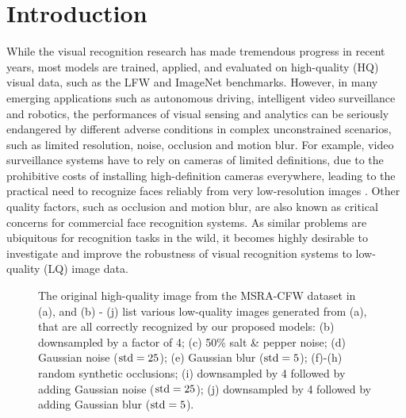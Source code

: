 \documentclass[10pt,twocolumn,twoside]{IEEEtran} %
\begin{document}
\section{Introduction}\label{sec:intro}%

While the visual recognition research has made tremendous progress in recent years, most models are trained, applied, and evaluated on high-quality (HQ) visual data, such as the LFW \cite{LFW} and ImageNet \cite{Alex} benchmarks. 
However, in many emerging applications such as autonomous driving, intelligent video surveillance and robotics, the performances of visual sensing and analytics can be seriously endangered by different adverse conditions \cite{de2014face} in complex unconstrained scenarios, such as limited resolution, noise, occlusion and motion blur. 
For example, video surveillance systems have to rely on cameras of limited definitions, due to the prohibitive costs of installing high-definition cameras everywhere, leading to the practical need to recognize faces reliably from very low-resolution images \cite{VFR}. 
Other quality factors, such as occlusion and motion blur, are also known as critical concerns for commercial face recognition systems. 
As similar problems are ubiquitous for recognition tasks in the wild, it becomes highly desirable to investigate and improve the robustness of visual recognition systems to low-quality (LQ) image data.

\begin{figure}[t]
	\centering
	\begin{minipage}{0.47\textwidth}
		\end{minipage}
	\caption{The original high-quality image from the MSRA-CFW dataset in (a), and (b) - (j) list various low-quality images generated from (a), that are all correctly recognized by our proposed models: (b) downsampled by a factor of 4; (c) 50\% salt \& pepper noise; (d) Gaussian noise (${\rm std} = 25$); (e) Gaussian blur (${\rm std} = 5$); (f)-(h) random synthetic occlusions; (i) downsampled by 4 followed by adding Gaussian noise (${\rm std} = 25$); (j) downsampled by 4 followed by adding Gaussian blur (${\rm std} = 5$).}
	\label{fig:intro}
\end{figure}
\end{document}
